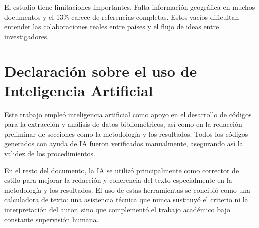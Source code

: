 \documentclass[twoside, twocolumn]{article}
\newcommand{\1}{\mathds{1}}						%
\begin{document}
El estudio tiene limitaciones importantes. Falta información geográfica en muchos documentos y el 13\% carece de referencias completas. Estos vacíos dificultan entender las colaboraciones reales entre países y el flujo de ideas entre investigadores.

\section*{Declaración sobre el uso de Inteligencia Artificial}

Este trabajo empleó inteligencia artificial como apoyo en el desarrollo de códigos para la extracción y análisis de datos bibliométricos, así como en la redacción preliminar de secciones como la metodología y los resultados. Todos los códigos generados con ayuda de IA fueron verificados manualmente, asegurando así la validez de los procedimientos.

En el resto del documento, la IA se utilizó principalmente como corrector de estilo para mejorar la redacción y coherencia del texto especialmente en la metodología y los resultados. El uso de estas herramientas se concibió como una calculadora de texto: una asistencia técnica que nunca sustituyó el criterio ni la interpretación del autor, sino que complementó el trabajo académico bajo constante supervisión humana.



\end{document}
